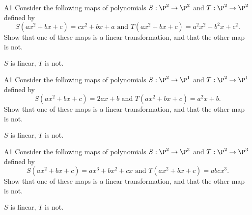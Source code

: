 \begin{problem}{A1}
Consider the following maps of polynomials \(S: \P^2 \rightarrow \P^2\)
and \(T:\P^2\rightarrow\P^2\) defined by
\[S(ax^2+bx+c)= cx^2+bx+a \text{ and }T(ax^2+bx+c) = a^2x^2+b^2x+c^2.\]
Show that one of these maps is a linear transformation, and that the other
map is not.
\end{problem}
\begin{solution}
  \(S\) is linear, \(T\) is not.
\end{solution}

\begin{problem}{A1}
Consider the following maps of polynomials \(S: \P^2 \rightarrow \P^1\)
and \(T:\P^2\rightarrow\P^1\) defined by
\[S(ax^2+bx+c)= 2ax+b \text{ and }T(ax^2+bx+c) = a^2x+b.\]
Show that one of these maps is a linear transformation, and that the other
map is not.
\end{problem}
\begin{solution}
  \(S\) is linear, \(T\) is not.
\end{solution}

\begin{problem}{A1}
Consider the following maps of polynomials \(S: \P^2 \rightarrow \P^3\)
and \(T:\P^2\rightarrow\P^3\) defined by
\[S(ax^2+bx+c)= ax^3+bx^2+cx \text{ and }T(ax^2+bx+c) = abcx^3.\]
Show that one of these maps is a linear transformation, and that the other
map is not.
\end{problem}
\begin{solution}
  \(S\) is linear, \(T\) is not.
\end{solution}
